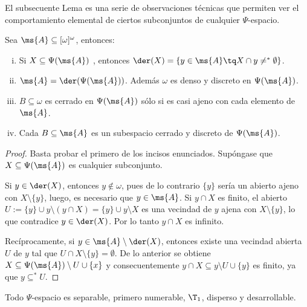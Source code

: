 	El subsecuente Lema es una serie de observaciones técnicas que permiten ver el comportamiento elemental de ciertos subconjuntos de cualquier $\Psi$-espacio.
	
	\begin{lema}\label{lem-primerosSubs}
		Sea $\ms{A} \subseteq [\omega]^\omega$, entonces:
		\begin{enumerate}[i)]
			\item Si $X \subseteq \Psi(\ms{A})$ , entonces $ \der(X)=\{ y \in \ms{A} \tq X \cap y \neq^* \emptyset \} $.
			\item $\ms{A}=\der( \Psi(\ms{A}) )$. Además $\omega$ es denso y discreto en $\Psi(\ms{A})$.
			\item $B \subseteq \omega$ es cerrado en $\Psi(\ms{A})$ sólo si es casi ajeno con cada elemento de $\ms{A}$.
			\item Cada $B \subseteq \ms{A}$ es un subespacio cerrado y discreto de $\Psi(\ms{A})$.
		\end{enumerate}
	\end{lema}
	
	\begin{proof} 
		Basta probar el primero de los incisos enunciados. Supóngase que $X \subseteq \Psi(\ms{A})$ es cualquier subconjunto.
		
		Si $y \in \der(X)$, entonces $y \notin \omega$, pues de lo contrario $\{y\}$ sería un abierto ajeno con $X \setminus \{y\}$, luego, es necesario que $y \in \ms{A}$. Si $y \cap X$ es finito, el abierto $U:=\{y\} \cup y \setminus (y \cap X)=\{y\} \cup y \setminus X$ es una vecindad de $y$ ajena con $X\setminus \{y\}$, lo que contradice $y \in \der(X)$. Por lo tanto $y \cap X$ es infinito.

		Recíprocamente, si $y \in \ms{A} \setminus \der(X)$, entonces existe una vecindad abierta $U$ de $y$ tal que $U \cap X \setminus \{y\} = \emptyset$. De lo anterior se obtiene $X \subseteq \Psi(\ms{A}) \setminus U \cup \{x\}$ y consecuentemente $y \cap X \subseteq y \setminus U \cup \{y\}$ es finito, ya que $y \subseteq^* U$.
	\end{proof}
		
	\begin{proposicion}\label{prop-PsiSiempre}
		Todo $\Psi$-espacio es separable, primero numerable, $\T_1$, disperso y desarrollable.
	\end{proposicion}
	

